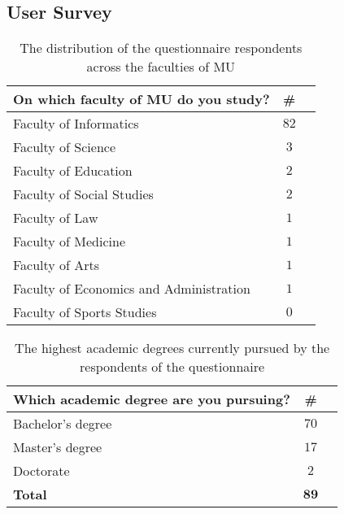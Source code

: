 \documentclass[11pt,twoside]{article}
\begin{document}
\subsection{User Survey}
\begin{frame}[c]
  \begin{table}[!b]
    \begin{tabularx}{\textwidth}{Xcr}
      \textbf{On which faculty of
      MU do you study?} & \textbf{\#}
      \\ \toprule Faculty of Informatics          & $82$
      \\ Faculty of Science                       &  $3$
      \\ Faculty of Education                     &  $2$
      \\ Faculty of Social Studies                &  $2$
      \\ Faculty of Law                           &  $1$
      \\ Faculty of Medicine                      &  $1$
      \\ Faculty of Arts                          &  $1$
      \\ Faculty of Economics and Administration  &  $1$
      \\ Faculty of Sports Studies                &  $0$
      \\
    \end{tabularx}
    \caption{The distribution of the questionnaire
      respondents across the faculties of MU}
  \end{table}
\end{frame}
\begin{frame}[c]
  \begin{table}[!b]
    \begin{tabularx}{\textwidth}{Xcr}
      \textbf{Which academic degree are you pursuing?} &
      \textbf{\#} \\
      \toprule
      Bachelor's degree  & $70$ \\
      Master's degree    & $17$ \\
      Doctorate          & $2$  \\
      \bottomrule
      \textbf{Total}     & $\mathbf{89}$
    \end{tabularx}
    \caption{The highest academic degrees currently pursued by the
      respondents of the questionnaire}
  \end{table}
\end{frame}
\end{document}
